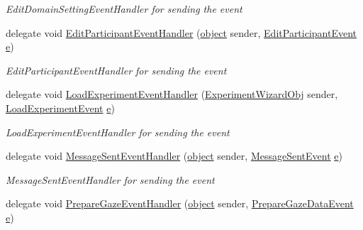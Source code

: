 \begin{DoxyCompactItemize}
\begin{DoxyCompactList}\small\item\em Edit\+Domain\+Setting\+Event\+Handler for sending the event \end{DoxyCompactList}\item 
delegate void \hyperlink{namespace_web_analyzer_1_1_events_a3259c67827e152226cea5a7ddbb8ce99}{Edit\+Participant\+Event\+Handler} (\hyperlink{_u_i_2_h_t_m_l_resources_2js_2lib_2underscore_8min_8js_aae18b7515bb2bc4137586506e7c0c903}{object} sender, \hyperlink{class_web_analyzer_1_1_events_1_1_edit_participant_event}{Edit\+Participant\+Event} \hyperlink{_u_i_2_h_t_m_l_resources_2js_2lib_2bootstrap_8min_8js_ab5902775854a8b8440bcd25e0fe1c120}{e})
\begin{DoxyCompactList}\small\item\em Edit\+Participant\+Event\+Handler for sending the event \end{DoxyCompactList}\item 
delegate void \hyperlink{namespace_web_analyzer_1_1_events_a13d6989d83a09589cd3e1012c644fcfc}{Load\+Experiment\+Event\+Handler} (\hyperlink{class_web_analyzer_1_1_u_i_1_1_interaction_objects_1_1_experiment_wizard_obj}{Experiment\+Wizard\+Obj} sender, \hyperlink{class_web_analyzer_1_1_events_1_1_load_experiment_event}{Load\+Experiment\+Event} \hyperlink{_u_i_2_h_t_m_l_resources_2js_2lib_2bootstrap_8min_8js_ab5902775854a8b8440bcd25e0fe1c120}{e})
\begin{DoxyCompactList}\small\item\em Load\+Experiment\+Event\+Handler for sending the event \end{DoxyCompactList}\item 
delegate void \hyperlink{namespace_web_analyzer_1_1_events_aea5ff6842ebd21bef8bcdc79762e6b3e}{Message\+Sent\+Event\+Handler} (\hyperlink{_u_i_2_h_t_m_l_resources_2js_2lib_2underscore_8min_8js_aae18b7515bb2bc4137586506e7c0c903}{object} sender, \hyperlink{class_web_analyzer_1_1_events_1_1_message_sent_event}{Message\+Sent\+Event} \hyperlink{_u_i_2_h_t_m_l_resources_2js_2lib_2bootstrap_8min_8js_ab5902775854a8b8440bcd25e0fe1c120}{e})
\begin{DoxyCompactList}\small\item\em Message\+Sent\+Event\+Handler for sending the event \end{DoxyCompactList}\item 
delegate void \hyperlink{namespace_web_analyzer_1_1_events_a871ece28a52add18a0e49e988aae2444}{Prepare\+Gaze\+Event\+Handler} (\hyperlink{_u_i_2_h_t_m_l_resources_2js_2lib_2underscore_8min_8js_aae18b7515bb2bc4137586506e7c0c903}{object} sender, \hyperlink{class_web_analyzer_1_1_events_1_1_prepare_gaze_data_event}{Prepare\+Gaze\+Data\+Event} \hyperlink{_u_i_2_h_t_m_l_resources_2js_2lib_2bootstrap_8min_8js_ab5902775854a8b8440bcd25e0fe1c120}{e})

\end{DoxyCompactItemize}
